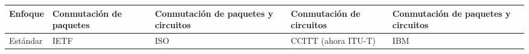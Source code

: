 \begin{longtable}{|>{\raggedright\arraybackslash}m{2.4cm}|>{\raggedright\arraybackslash}m{2.8cm}|>{\raggedright\arraybackslash}m{2.8cm}|>{\raggedright\arraybackslash}m{2.8cm}|>{\raggedright\arraybackslash}m{2.8cm}|}
      Enfoque                 & Conmutación de paquetes                                                                                                                                                                & Conmutación de paquetes y circuitos                                                                                                                                                                                                                  & Conmutación de circuitos                                                                                                                                                                                                                                                                                                                                                         & Conmutación de paquetes y circuitos                                                                                                                                                                                                                                                    \\ \hline
      Estándar                & IETF                                                                                                                                                                                   & ISO                                                                                                                                                                                                                                                  & CCITT (ahora ITU-T)                                                                                                                                                                                                                                                                                                                                                              & IBM                                                                                                                                                                                                                                                                                    \\ \hline

\end{longtable}
